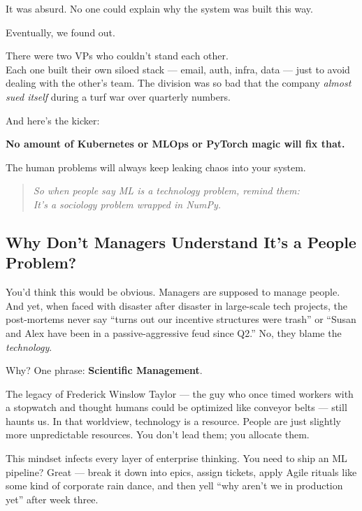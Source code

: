 It was absurd. No one could explain why the system was built this way.

Eventually, we found out.

There were two VPs who couldn’t stand each other.\\
Each one built their own siloed stack — email, auth, infra, data — just to avoid dealing with the other’s team. The division was so bad that the company \textit{almost sued itself} during a turf war over quarterly numbers.

And here’s the kicker:

\textbf{No amount of Kubernetes or MLOps or PyTorch magic will fix that.}

The human problems will always keep leaking chaos into your system.

\vspace{1em}

\begin{quote}
\textit{So when people say ML is a technology problem, remind them: \\It’s a sociology problem wrapped in NumPy.}
\end{quote}

\subsection{Why Don’t Managers Understand It’s a People Problem?}

You’d think this would be obvious. Managers are supposed to manage people. And yet, when faced with disaster after disaster in large-scale tech projects, the post-mortems never say “turns out our incentive structures were trash” or “Susan and Alex have been in a passive-aggressive feud since Q2.” No, they blame the \textit{technology}.

Why? One phrase: \textbf{Scientific Management}.

The legacy of Frederick Winslow Taylor — the guy who once timed workers with a stopwatch and thought humans could be optimized like conveyor belts — still haunts us. In that worldview, technology is a resource. People are just slightly more unpredictable resources. You don’t lead them; you allocate them.

This mindset infects every layer of enterprise thinking. You need to ship an ML pipeline? Great — break it down into epics, assign tickets, apply Agile rituals like some kind of corporate rain dance, and then yell “why aren’t we in production yet” after week three.

